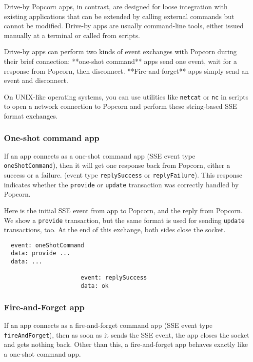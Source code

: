 \documentclass[12pt]{article}
\begin{document}
Drive-by Popcorn apps, in contrast, are designed for loose integration
with existing applications that can be extended by calling external
commands but cannot be modified. Drive-by apps are usually
command-line tools, either issued manually at a terminal or called
from scripts.

Drive-by apps can perform two kinds of event exchanges with Popcorn
during their brief connection: **one-shot command** apps send one
event, wait for a response from Popcorn, then
disconnect. **Fire-and-forget** apps simply send an event and
disconnect.

On UNIX-like operating systems, you can use utilities like \verb`netcat` or
\verb`nc` in scripts to open a network connection to Popcorn and perform
these string-based SSE format exchanges.

\subsubsection{One-shot command app}

If an app connects as a one-shot command app (SSE event type
\verb`oneShotCommand`), then it will get one response back from Popcorn,
either a success or a failure. (event type \verb`replySuccess` or
\verb`replyFailure`).  This response indicates whether the \verb`provide` or
\verb`update` transaction was correctly handled by Popcorn.

Here is the initial SSE event from app to Popcorn, and the reply from
Popcorn.  We show a \verb`provide` transaction, but the same format is used
for sending \verb`update` transactions, too. At the end of this exchange,
both sides close the socket.

\begin{verbatim}
  event: oneShotCommand
  data: provide ...
  data: ...

                      event: replySuccess
                      data: ok

\end{verbatim}

\subsubsection{Fire-and-Forget app}

If an app connects as a fire-and-forget command app (SSE event type
\verb`fireAndForget`), then as soon as it sends the SSE event, the app
closes the socket and gets nothing back. Other than this, a
fire-and-forget app behaves exactly like a one-shot command app.
\end{document}
